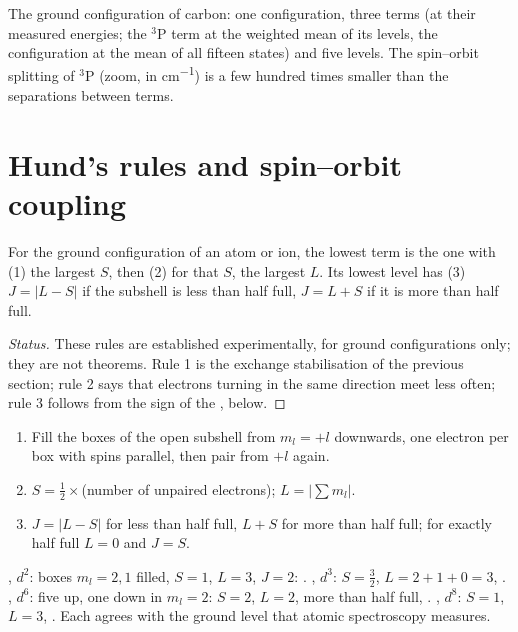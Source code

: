 \begin{omfigure}
{\small The ground configuration of carbon: one configuration, three terms
(at their measured energies; the ${}^3$P term at the weighted mean of its
levels, the configuration at the mean of all fifteen states) and five
levels. The spin--orbit splitting of ${}^3$P (zoom, in
\unit{cm^{-1}}) is a few hundred times smaller than the separations between
terms.}
\end{omfigure}

\section{Hund's rules and spin--orbit coupling}

\begin{proposition}\label{prop:b3:many-electron-atoms:hund-terms}
For the ground configuration of an atom or ion, the lowest term is the one
with (1) the largest $S$, then (2) for that $S$, the largest $L$. Its lowest
level has (3) $J = |L - S|$ if the subshell is less than half full, $J = L +
S$ if it is more than half full.
\end{proposition}
\begin{proof}[Status]
These rules are established experimentally, for ground configurations only;
they are not theorems. Rule 1 is the exchange stabilisation of the previous
section; rule 2 says that electrons turning in the same direction meet less
often; rule 3 follows from the sign of the , below.
\end{proof}

\begin{method}\label{met:b3:many-electron-atoms:ground-term}
\begin{enumerate}
  \item Fill the boxes of the open subshell from $m_l = +l$ downwards, one
        electron per box with spins parallel, then pair from $+l$ again.
  \item $S = \frac12 \times$(number of unpaired electrons); $L = |\sum m_l|$.
  \item $J = |L - S|$ for less than half full, $L + S$ for more than half
        full; for exactly half full $L = 0$ and $J = S$.
\end{enumerate}
\end{method}

\begin{example}\label{ex:b3:many-electron-atoms:ground-terms}
, $d^2$: boxes $m_l = 2, 1$ filled, $S = 1$, $L = 3$, $J = 2$:
. , $d^3$: $S = \frac32$, $L = 2 + 1 + 0 = 3$,
. , $d^6$: five up, one down in $m_l = 2$:
$S = 2$, $L = 2$, more than half full, . , $d^8$:
$S = 1$, $L = 3$, . Each agrees with the ground level that
atomic spectroscopy measures.
\end{example}

